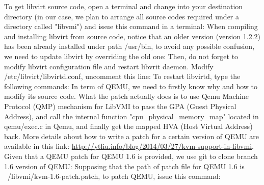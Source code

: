 To get libvirt source code, open a terminal and change into your destination directory (in our case, we plan to arrange 
all source codes required under a directory called "libvmi") and issue this command in a terminal:
When compiling and installing libvirt from source code, notice that an older version (version 1.2.2) has been already 
installed under path /usr/bin, to avoid any possible confusion, we need to update libvirt by overriding the old one:
Then, do not forget to modify libvirt configuration file and restart libvrit daemon. Modify /etc/libvirt/libvirtd.conf, uncomment this line:
To restart libvirtd, type the following commands:
In term of QEMU, we need to firstly know why and how to modify its source code. What the patch actually does is to use 
Qemu Machine Protocol (QMP) mechanism for LibVMI to pass the GPA (Guest Physical Address), and call the internal function 
"cpu\_physical\_memory\_map" located in qemu/exec.c in Qemu, and finally get the mapped HVA (Host Virtual Address) back. 
More details about how to write a patch for a certain version of QEMU are available in this link:
\url{http://ytliu.info/blog/2014/03/27/kvm-support-in-libvmi}. Given that a QEMU patch for QEMU 1.6 is provided, we use git
to clone branch 1.6 version of QEMU:
Supposing that the path of patch file for QEMU 1.6 is ~/libvmi/kvm-1.6-patch.patch, to patch QEMU, issue this command:
